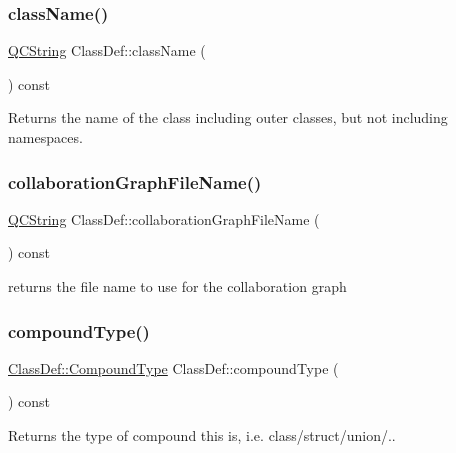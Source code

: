 \subsubsection{\texorpdfstring{className()}{className()}}
{\footnotesize\ttfamily \mbox{\hyperlink{class_q_c_string}{Q\+C\+String}} Class\+Def\+::class\+Name (\begin{DoxyParamCaption}{ }\end{DoxyParamCaption}) const}

Returns the name of the class including outer classes, but not including namespaces. \mbox{\label{class_class_def_a6070aff6274033d7fef0335f9b0ab580}} 
\subsubsection{\texorpdfstring{collaborationGraphFileName()}{collaborationGraphFileName()}}
{\footnotesize\ttfamily \mbox{\hyperlink{class_q_c_string}{Q\+C\+String}} Class\+Def\+::collaboration\+Graph\+File\+Name (\begin{DoxyParamCaption}{ }\end{DoxyParamCaption}) const}

returns the file name to use for the collaboration graph \mbox{\label{class_class_def_a6dc63f555dae8c2e55f8fc586ec70860}} 
\subsubsection{\texorpdfstring{compoundType()}{compoundType()}}
{\footnotesize\ttfamily \mbox{\hyperlink{class_class_def_ae70cf86d35fe954a94c566fbcfc87939}{Class\+Def\+::\+Compound\+Type}} Class\+Def\+::compound\+Type (\begin{DoxyParamCaption}{ }\end{DoxyParamCaption}) const}

Returns the type of compound this is, i.\+e. class/struct/union/.. \mbox{\label{class_class_def_aa9f6b0d40e7eedee9a80810051fdc6c7}} 
